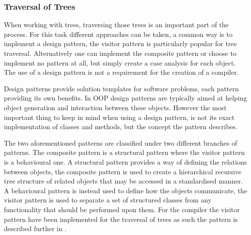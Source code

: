 \subsubsection*{Traversal of Trees}
When working with trees, traversing those trees is an important part of the process.
For this task different approaches can be taken, a common way is to implement a design pattern, the visitor pattern is particularly popular for tree traversal.
Alternatively one can implement the composite pattern or choose to implement no pattern at all, but simply create a case analysis for each object.
The use of a design pattern is not a requirement for the creation of a compiler.

Design patterns provide solution templates for software problems, each pattern providing its own benefits.
In OOP design patterns are typically aimed at helping object generation and interaction between these objects.
However the most important thing to keep in mind when using a design pattern, is not its exact implementation of classes and methods, but the concept the pattern describes.

The two aforementioned patterns are classified under two different branches of patterns.
The composite pattern is a structural pattern where the visitor pattern is a behavioural one.
A structural pattern provides a way of defining the relations between objects, the composite pattern is used to create a hierarchical recursive tree structure of related objects that may be accessed in a standardised manner.
A behavioural pattern is instead used to define how the objects communicate, the visitor pattern is used to separate a set of structured classes from any functionality that should be performed upon them.
For the compiler the visitor pattern have been implemented for the traversal of trees as such the pattern is described further in .  
